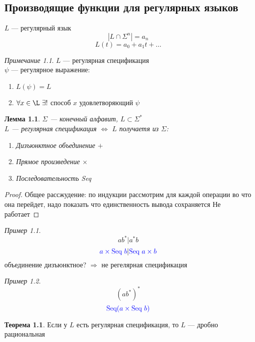 \documentclass[oneside]{book}
\theoremstyle{plain}
\newtheorem{lemma}{Лемма}
\theoremstyle{remark}
\newtheorem*{remark}{Примечание}
\newtheorem*{examp}{Пример}
\theoremstyle{definition}
\newtheorem{theorem}{Теорема}[section]
\begin{document}
\chapter{}
\label{sec:org84a65d1}
\usetikzlibrary{automata}



\section{Производящие функции для регулярных языков}
\label{sec:org1abc5c1}
\(L\) --- регулярный язык
\[ | L \cap \Sigma^n | = a_n \] 
\[ L(t) = a_0 + a_1 t + \dots \]
\begin{remark}
\(L\) --- регулярная спецификация \\
\(\psi\) --- регулярное выражение:
\begin{enumerate}
\item \(L(\psi) = L\)
\item \(\forall x \in \L\ \exists !\) способ \(x\) удовлетворяющий \(\psi\)
\end{enumerate}
\end{remark}
\begin{lemma}
\(\Sigma\) --- конечный алфавит, \(L \subset \Sigma^*\) \\
\(L\) --- регулярная спецификация \(\Leftrightarrow\) \(L\) получаетя из \(\Sigma\):
\begin{enumerate}
\item Дизъюнктное объединение \(+\)
\item Прямое произведение \(\times\)
\item Последовательность Seq
\end{enumerate}
\end{lemma}
\begin{proof}
Общее рассжудение: по индукции рассмотрим для каждой операции во что
она перейдет, надо показать что единственность вывода сохраняется \color{red} Не работает \color{black}
\end{proof}
\begin{examp}
\[ ab^*|a^*b \]
\[ \color{blue}a \times \text{Seq }b\color{black}|\color{blue}\text{Seq } a \times b\color{black} \]
объединение дизъюнктное? \(\Rightarrow\) не регелярная спецификация
\end{examp}
\begin{examp}
\[ (ab^*)^* \]
\[ \color{blue} \text{Seq}(a \times \text{Seq } b) \color{black} \]
\end{examp}
\begin{theorem}
Если у \(L\) есть регулярная спецификация, то \(L\) --- дробно рациональная
\end{theorem}
\end{document}
